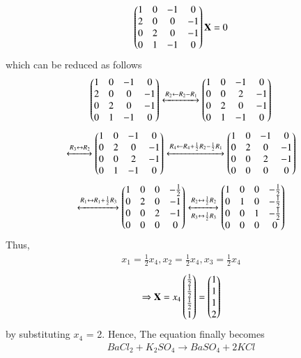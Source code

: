 \documentclass[journal,12pt,onecolumn]{IEEEtran}
\begin{document}
		\begin{align}
				\begin{pmatrix}1 & 0 &-1&0\\2&0&0&-1\\0&2&0&-1\\0&1&-1&0\end{pmatrix}\mathbf{X} = 0
		\end{align}
		which can be reduced as follows
		\begin{align}
				\begin{pmatrix}
						1&0&-1&0\\
						2&0&0&-1\\
						0&2&0&-1\\
						0&1&-1&0
				\end{pmatrix}\xleftrightarrow[]{R_2\leftarrow R_2-R_1} 
				\begin{pmatrix}
						1&0&-1&0\\
						0&0&2&-1\\
						0&2&0&-1\\
						0&1&-1&0\end{pmatrix}
		\end{align}
		\begin{align}
				\xleftrightarrow[]{R_3\leftrightarrow R_2} 
				\begin{pmatrix}
						1&0&-1&0\\
						0&2&0&-1\\
						0&0&2&-1\\
						0&1&-1&0
				\end{pmatrix}\xleftrightarrow[]{R_4\leftarrow R_4+\frac{1}{2}R_2-\frac{1}{2}R_1} 
				\begin{pmatrix}
						1&0&-1&0\\
						0&2&0&-1\\
						0&0&2&-1\\
						0&0&0&0\end{pmatrix}
		\end{align}
		\begin{align}
				\xleftrightarrow[]{R_1\leftrightarrow R_1+\frac{1}{2}R_3} 
				\begin{pmatrix}
						1&0&0&-\frac{1}{2}\\
						0&2&0&-1\\
						0&0&2&-1\\
						0&0&0&0\end{pmatrix}
				\xleftrightarrow[R_3\leftrightarrow \frac{1}{2}R_3]{R_2\leftrightarrow \frac{1}{2}R_2} 
				\begin{pmatrix}
						1&0&0&-\frac{1}{2}\\
						0&1&0&-\frac{1}{2}\\
						0&0&1&-\frac{1}{2}\\
						0&0&0&0\end{pmatrix}
		\end{align}
		Thus,
		\begin{align}
				x_1 = \frac{1}{2}x_4,x_2 = \frac{1}{2}x_4,x_3 = \frac{1}{2}x_4
		\end{align}
		\begin{align}
				\Rightarrow \mathbf{X} = x_4\begin{pmatrix}\frac{1}{2}\\\frac{1}{2}\\\frac{1}{2}\\1\end{pmatrix} = \begin{pmatrix}1\\1\\1\\2\end{pmatrix}
		\end{align}
		by substituting $x_4$ = 2. Hence, The equation finally becomes
		\begin{align}
				BaCl_2+K_2SO_4 \rightarrow BaSO_4+2KCl
		\end{align}

				
\end{document}
